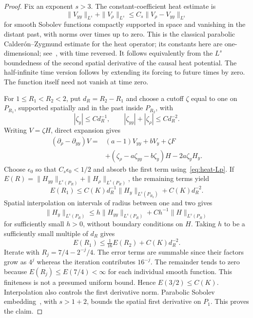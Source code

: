 \begin{proof}
Fix an exponent \(s>3\). The constant-coefficient heat estimate is
\begin{equation}\label{eq:heat-Lp}
\|V_{yy}\|_{L^s}+\|V_\rho\|_{L^s}
\le C_s\|V_\rho-V_{yy}\|_{L^s}
\end{equation}
for smooth Sobolev functions compactly supported in space and vanishing in the distant
past, with norms over times up to zero. This is the classical parabolic
Calder\'on--Zygmund estimate for the heat operator; its constants here are
one-dimensional; see~\cite[Theorem~5.5]{Krylov2006}, with time reversed.
It follows equivalently from the \(L^s\) boundedness of
the second spatial derivative of the causal heat potential. The
half-infinite time version follows by extending its forcing to future
times by zero. The function itself need not vanish at time zero.

For \(1\le R_1<R_2<2\), put \(d_R=R_2-R_1\) and choose a cutoff
\(\zeta\) equal to one on \(P_{R_1}\), supported spatially and in the
past inside \(P_{R_2}\), with
\[
|\zeta_y|\le C d_R^{-1},\qquad
|\zeta_{yy}|+|\zeta_\rho|\le C d_R^{-2}.
\]
Writing \(V=\zeta H\), direct expansion gives
\begin{equation}\label{eq:cutoff-heat}
\begin{split}
(\partial_\rho-\partial_{yy})V={}&(a-1)V_{yy}+bV_y+\zeta F\\
&+(\zeta_\rho-a\zeta_{yy}-b\zeta_y)H-2a\zeta_yH_y.
\end{split}
\end{equation}
Choose \(\epsilon_0\) so that \(C_s\epsilon_0<1/2\) and absorb the first
term using~\eqref{eq:heat-Lp}. If
\(E(R)=\|H_{yy}\|_{L^s(P_R)}+\|H_\rho\|_{L^s(P_R)}\), the remaining
terms yield
\[
E(R_1)\le C(K)d_R^{-1}\|H_y\|_{L^s(P_{R_2})}+C(K)d_R^{-2}.
\]
Spatial interpolation on intervals of radius between one and two gives
\[
\|H_y\|_{L^s(P_R)}\le h\|H_{yy}\|_{L^s(P_R)}
       +C h^{-1}\|H\|_{L^s(P_R)}
\]
for sufficiently small \(h>0\), without boundary conditions on \(H\).
Taking \(h\) to be a sufficiently small multiple of \(d_R\) gives
\begin{equation}\label{eq:interior-iteration}
E(R_1)\le\tfrac1{16}E(R_2)+C(K)d_R^{-2}.
\end{equation}
Iterate with \(R_j=7/4-2^{-j}/4\). The error terms are summable since
their factors grow as \(4^j\) whereas the iteration contributes
\(16^{-j}\). The remainder tends to zero because
\(E(R_j)\le E(7/4)<\infty\) for each individual smooth function. This
finiteness is not a presumed uniform bound. Hence \(E(3/2)\le C(K)\).
Interpolation also controls the first derivative norm. Parabolic Sobolev
embedding~\cite[Chapter~II, Section~3, Lemma~3.3]{LSU1968},
with \(s>1+2\), bounds the spatial first derivative on
\(P_1\). This proves the claim.
\end{proof}

